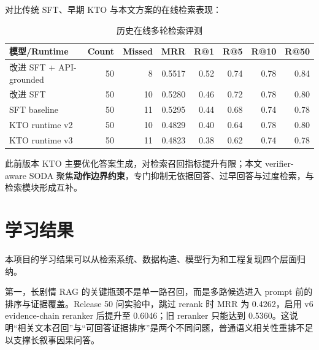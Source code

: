 \documentclass[UTF8,a4paper,12pt]{ctexart}
\begin{document}
对比传统 SFT、早期 KTO 与本文方案的在线检索表现：

\begin{table}[htbp]
\centering
\small
\begin{tabular}{lrrrrrrr}
\toprule
模型/Runtime & Count & Missed & MRR & R@1 & R@5 & R@10 & R@50 \\
\midrule
改进 SFT + API-grounded & 50 & 8 & 0.5517 & 0.52 & 0.74 & 0.78 & 0.84 \\
改进 SFT & 50 & 10 & 0.5280 & 0.46 & 0.72 & 0.78 & 0.80 \\
SFT baseline & 50 & 11 & 0.5295 & 0.44 & 0.68 & 0.74 & 0.78 \\
KTO runtime v2 & 50 & 10 & 0.4829 & 0.40 & 0.64 & 0.78 & 0.80 \\
KTO runtime v3 & 50 & 11 & 0.4823 & 0.38 & 0.62 & 0.74 & 0.78 \\
\bottomrule
\end{tabular}
\caption{历史在线多轮检索评测}
\end{table}

此前版本 KTO 主要优化答案生成，对检索召回指标提升有限；本文 verifier-aware SODA 聚焦\textbf{动作边界约束}，专门抑制无依据回答、过早回答与过度检索，与检索模块形成互补。

\section{学习结果}

本项目的学习结果可以从检索系统、数据构造、模型行为和工程复现四个层面归纳。

第一，长剧情 RAG 的关键瓶颈不是单一路召回，而是多路候选进入 prompt 前的排序与证据覆盖。Release 50 问实验中，跳过 rerank 时 MRR 为 0.4262，启用 v6 evidence-chain reranker 后提升至 0.6046；旧 reranker 只能达到 0.5360。这说明“相关文本召回”与“可回答证据排序”是两个不同问题，普通语义相关性重排不足以支撑长叙事因果问答。
\end{document}
